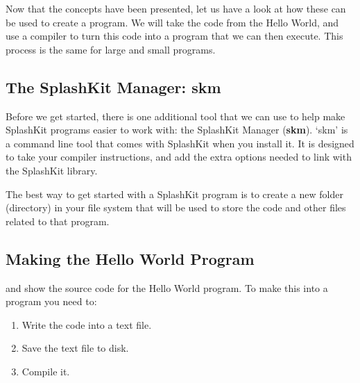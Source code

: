 Now that the concepts have been presented, let us have a look at how these can be used to create a program. We will take the code from the Hello World, and use a compiler to turn this code into a program that we can then execute. This process is the same for large and small programs.

\subsection{The SplashKit Manager: skm} %
\label{sub:skm}

Before we get started, there is one additional tool that we can use to help make SplashKit programs easier to work with: the SplashKit Manager (\textbf{skm}). `skm' is a command line tool that comes with SplashKit when you install it. It is designed to take your compiler instructions, and add the extra options needed to link with the SplashKit library.

The best way to get started with a SplashKit program is to create a new folder (directory) in your file system that will be used to store the code and other files related to that program. 



\subsection{Making the Hello World Program} %
\label{sub:compiling_code}

 and  show the source code for the Hello World program. To make this into a program you need to:

\begin{enumerate}
  \item Write the code into a text file.
  \item Save the text file to disk.
  \item Compile it.
\end{enumerate}

